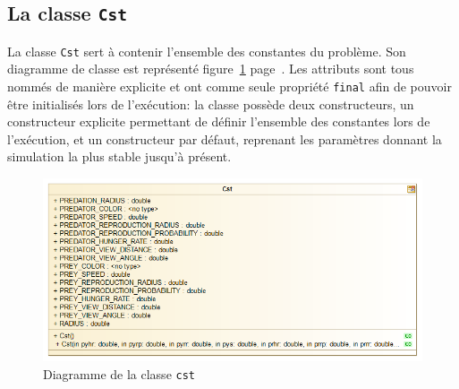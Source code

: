 \documentclass[12pt,a4paper,titlepage]{article}
\begin{document}
\subsection{La classe \texttt{Cst}}
\FloatBarrier
La classe \texttt{Cst} sert à contenir l'ensemble des constantes du problème. Son diagramme de classe est représenté figure~\ref{cst} page~\pageref{cst}. Les attributs sont tous nommés de manière explicite et ont comme seule propriété \texttt{final} afin de pouvoir être initialisés lors de l'exécution: la classe possède deux constructeurs, un constructeur explicite permettant de définir l'ensemble des constantes lors de l'exécution, et un constructeur par défaut, reprenant les paramètres donnant la simulation la plus stable jusqu'à présent.
\begin{figure}[h]
\includegraphics[width = \textwidth]{"../diagrammes/cst"}
\caption{Diagramme de la classe \texttt{cst}}
\label{cst}
\end{figure}
\FloatBarrier
\end{document}
